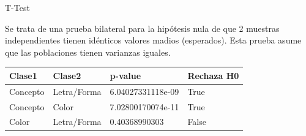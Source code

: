 \documentclass{beamer}
\begin{document}
\begin{frame}{T-Test}

Se trata de una prueba bilateral para la hipótesis nula de que 2 muestras independientes tienen idénticos valores madios (esperados). Esta prueba asume que las poblaciones tienen varianzas iguales.

\begin{center}
    \begin{tabular}{ | p{2cm} | p{2cm} | p{3.5cm} | p{2cm} |}
    \hline
     Clase1       &  Clase2 			&  p-value               & Rechaza H0		\\ 
    \hline
     Concepto    &  Letra/Forma	    &  6.04027331118e-09     & True 				\\ 
     Concepto    &  Color 			&  7.02800170074e-11   	 & True				\\ 
     Color 		 &  Letra/Forma     &  0.40368990303         & False 				\\ 
    \hline
    \end{tabular}
\end{center} 

\end{frame}





\end{document}
